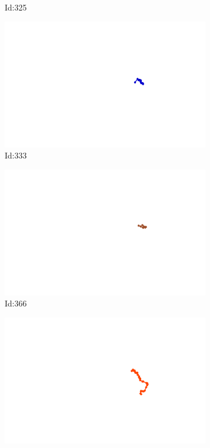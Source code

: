 \documentclass[12pt,twoside]{report}
\begin{document}
\begin{figure}
\begin{subfigure}[b]{0.20\textwidth}
\caption{Id:325}
\end{subfigure}
\begin{subfigure}[b]{0.20\textwidth}
\centering
\includegraphics[width=\textwidth]{../../trajectories/333.png}
\caption{Id:333}
\end{subfigure}
\begin{subfigure}[b]{0.20\textwidth}
\centering
\includegraphics[width=\textwidth]{../../trajectories/366.png}
\caption{Id:366}
\end{subfigure}
\begin{subfigure}[b]{0.20\textwidth}
\centering
\includegraphics[width=\textwidth]{../../trajectories/440.png}

\end{subfigure}
\end{figure}
\end{document}
